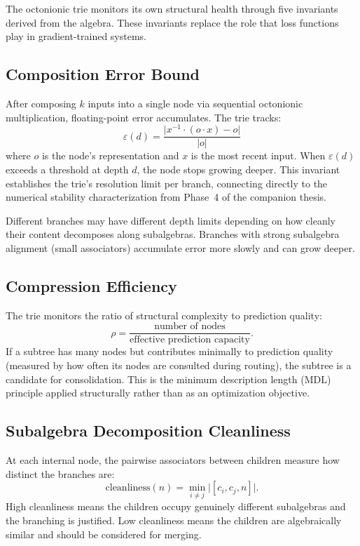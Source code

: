 \documentclass[11pt,a4paper]{article}
\theoremstyle{definition}
\theoremstyle{remark}
\begin{document}
The octonionic trie monitors its own structural health through five invariants derived from the algebra. These invariants replace the role that loss functions play in gradient-trained systems.

\subsection{Composition Error Bound}

After composing $k$ inputs into a single node via sequential octonionic multiplication, floating-point error accumulates. The trie tracks:
\begin{equation}
  \varepsilon(d) = \frac{\lvert x^{-1} \cdot (o \cdot x) - o \rvert}{\lvert o \rvert}
\end{equation}
where $o$ is the node's representation and $x$ is the most recent input. When $\varepsilon(d)$ exceeds a threshold at depth $d$, the node stops growing deeper. This invariant establishes the trie's resolution limit per branch, connecting directly to the numerical stability characterization from Phase~4 of the companion thesis.

Different branches may have different depth limits depending on how cleanly their content decomposes along subalgebras. Branches with strong subalgebra alignment (small associators) accumulate error more slowly and can grow deeper.

\subsection{Compression Efficiency}

The trie monitors the ratio of structural complexity to prediction quality:
\begin{equation}
  \rho = \frac{\text{number of nodes}}{\text{effective prediction capacity}}.
\end{equation}
If a subtree has many nodes but contributes minimally to prediction quality (measured by how often its nodes are consulted during routing), the subtree is a candidate for consolidation. This is the minimum description length (MDL) principle applied structurally rather than as an optimization objective.

\subsection{Subalgebra Decomposition Cleanliness}

At each internal node, the pairwise associators between children measure how distinct the branches are:
\begin{equation}
  \text{cleanliness}(n) = \min_{i \neq j} \lvert [c_i, c_j, n] \rvert.
\end{equation}
High cleanliness means the children occupy genuinely different subalgebras and the branching is justified. Low cleanliness means the children are algebraically similar and should be considered for merging.
\end{document}
